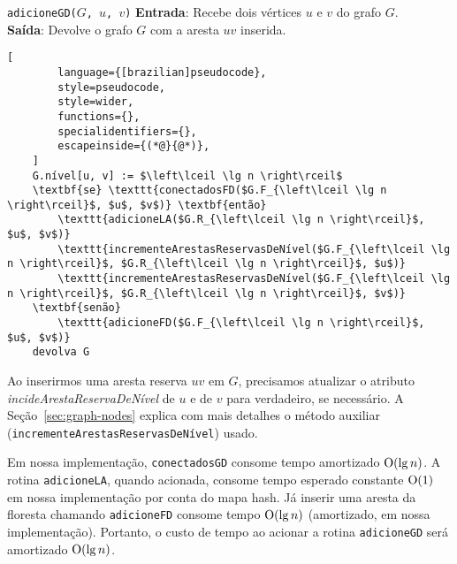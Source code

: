 \begin{programruledcaption}{\texttt{adicioneGD($G$, $u$, $v$)} \label{prog:addGD}}
    \noindent\textbf{Entrada}: Recebe dois vértices $u$ e $v$ do grafo $G$. \\
    \textbf{Saída}: Devolve o grafo $G$ com a aresta $uv$ inserida.
    \vspace{-0.5\baselineskip}
    \begin{lstlisting}[
        language={[brazilian]pseudocode},
        style=pseudocode,
        style=wider,
        functions={},
        specialidentifiers={},
        escapeinside={(*@}{@*)},
    ]
    G.nível[u, v] := $\left\lceil \lg n \right\rceil$
    \textbf{se} \texttt{conectadosFD($G.F_{\left\lceil \lg n \right\rceil}$, $u$, $v$)} \textbf{então}
        \texttt{adicioneLA($G.R_{\left\lceil \lg n \right\rceil}$, $u$, $v$)}
        \texttt{incrementeArestasReservasDeNível($G.F_{\left\lceil \lg n \right\rceil}$, $G.R_{\left\lceil \lg n \right\rceil}$, $u$)}
        \texttt{incrementeArestasReservasDeNível($G.F_{\left\lceil \lg n \right\rceil}$, $G.R_{\left\lceil \lg n \right\rceil}$, $v$)}
    \textbf{senão}
        \texttt{adicioneFD($G.F_{\left\lceil \lg n \right\rceil}$, $u$, $v$)}
    devolva G
    \end{lstlisting}
    \vspace{-0.5\baselineskip}
\end{programruledcaption}

\raggedbottom

Ao inserirmos uma aresta reserva $uv$ em $G$, precisamos atualizar o atributo \textit{incideArestaReservaDeNível} de $u$ e de $v$ para verdadeiro, se necessário. A Seção~\ref{sec:graph-nodes} explica com mais detalhes o método auxiliar (\texttt{incrementeArestasReservasDeNível}) usado. 

Em nossa implementação, \texttt{conectadosGD} consome tempo amortizado $\mathrm{O}(\lg n)$. A rotina \texttt{adicioneLA}, quando acionada, consome tempo esperado constante $\mathrm{O}(1)$ em nossa implementação por conta do mapa hash. Já inserir uma aresta da floresta chamando \texttt{adicioneFD} consome tempo $\mathrm{O}(\lg n)$ (amortizado, em nossa implementação). Portanto, o custo de tempo ao acionar a rotina \texttt{adicioneGD} será amortizado $\mathrm{O}(\lg n)$.

